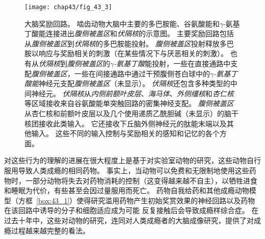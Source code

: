 \begin{figure}[htbp]
	\centering
	\texttt{[image: chap43/fig\_43\_3]}
	\caption{大脑奖励回路。
		啮齿动物大脑中主要的多巴胺能、谷氨酸能和$\gamma$-氨基丁酸能连接进出\textit{腹侧被盖区}和\textit{伏隔核}的示意图。
		主要奖励回路包括从\textit{腹侧被盖区}到\textit{伏隔核}的多巴胺能投射。
		\textit{腹侧被盖区}投射释放多巴胺以响应与奖励相关的刺激（在某些情况下与厌恶相关的刺激）。
		也有从\textit{伏隔核}到\textit{腹侧被盖区}的\textit{$\gamma$-氨基丁酸}能投射，一些在直接通路中支配\textit{腹侧被盖区}，一些在间接通路中通过干预腹侧苍白球中的\textit{$\gamma$-氨基丁酸能}神经元支配\textit{腹侧被盖区}（未显示）。
		\textit{伏隔核}还包含多种类型的中间神经元。
		\textit{伏隔核}从\textit{内侧前额叶皮层}、\textit{海马体}、\textit{外侧缰核}和\textit{杏仁核}等区域接收来自谷氨酸能单突触回路的密集神经支配。
		\textit{腹侧被盖区}从杏仁核和前额叶皮层以及几个使用递质乙酰胆碱（未显示）的脑干核团接收此类输入。
		它还接收下丘脑外侧神经元的肽能末端以及其他输入。
		这些不同的输入控制与奖励相关的感知和记忆的各个方面\cite{russo2013brain}。}
	\label{fig:43_3}
\end{figure}


对这些行为的理解的进展在很大程度上是基于对实验室动物的研究，这些动物自行服用导致人类成瘾的相同药物。
事实上，当动物可以免费和无限制地使用这些药物时，一部分动物将失去对药物消耗的控制（这变得越来越不自主），以牺牲进食和睡眠为代价，有些甚至会因过量服用而死亡。
药物自我给药和其他成瘾动物模型（方框~\ref{box:43_1}）使得研究滥用药物产生初始奖赏效果的神经回路以及药物在该回路中诱导的分子和细胞适应成为可能 反复接触后会导致成瘾样综合症。
在过去十年中，这些对动物的研究，连同对人类成瘾者的大脑成像研究，提供了对成瘾过程越来越完整的看法。


